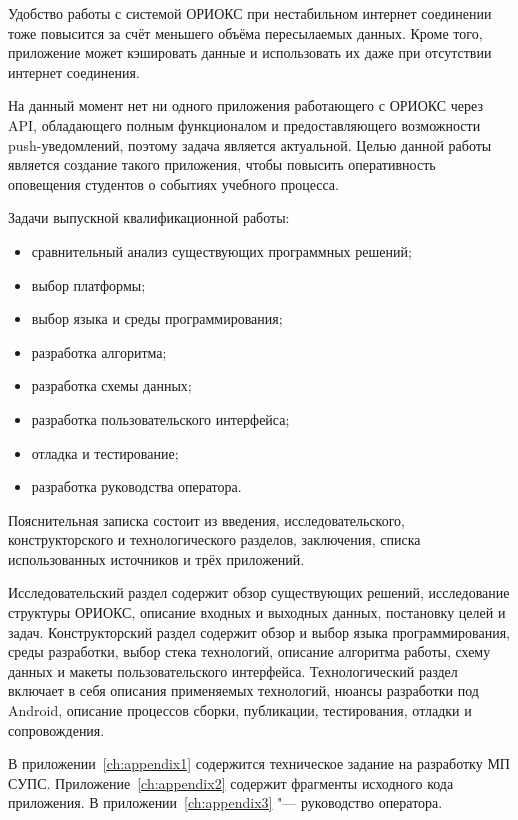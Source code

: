 Удобство работы с системой ОРИОКС при нестабильном интернет соединении тоже повысится за счёт меньшего объёма пересылаемых данных.
Кроме того, приложение может кэшировать данные и использовать их даже при отсутствии интернет соединения.

На данный момент нет ни одного приложения работающего с ОРИОКС через API, обладающего полным функционалом и предоставляющего возможности push-уведомлений, поэтому задача является актуальной.
Целью данной работы является создание такого приложения, чтобы повысить оперативность оповещения студентов о событиях учебного процесса.

Задачи выпускной квалификационной работы:
\begin{itemize}
  \item сравнительный анализ существующих программных решений;
  \item выбор платформы;
  \item выбор языка и среды программирования;
  \item разработка алгоритма;
  \item разработка схемы данных;
  \item разработка пользовательского интерфейса;
  \item отладка и тестирование;
  \item разработка руководства оператора.
\end{itemize}

Пояснительная записка состоит из введения, исследовательского, конструкторского и технологического разделов, заключения, списка использованных источников и трёх приложений.

Исследовательский раздел содержит обзор существующих решений, исследование структуры ОРИОКС, описание входных и выходных данных, постановку целей и задач.
Конструкторский раздел содержит обзор и выбор языка программирования, среды разработки, выбор стека технологий, описание алгоритма работы, схему данных и макеты пользовательского интерфейса.
Технологический раздел включает в себя описания применяемых технологий, нюансы разработки под Android, описание процессов сборки, публикации, тестирования, отладки и сопровождения.

В приложении~\ref{ch:appendix1} содержится техническое задание на разработку МП СУПС.
Приложение~\ref{ch:appendix2} содержит фрагменты исходного кода приложения.
В приложении~\ref{ch:appendix3} "--- руководство оператора.
